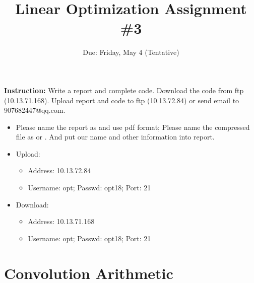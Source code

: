 \documentclass[12pt]{article}
\title{\textbf{Linear Optimization Assignment \#3}}
\author{Due: Friday, May 4 (Tentative)}
\date{}
\newcommand{\red}[1]{{\color{red}{#1}}}
\providecommand{\tightlist}{%
	\setlength{\itemsep}{0pt}\setlength{\parskip}{0pt}}
\begin{document}
\maketitle

\textbf{\color{NavyBlue}Instruction:} Write a report and complete code.
Download the code from ftp (10.13.71.168). Upload report and code to ftp (10.13.72.84) or send email to 907682447@qq.com.
\begin{itemize}
	\tightlist
	\item {Please} name the report as \red{hw3\_31xxxxxxxx.pdf} and use pdf format; {Please} name the compressed file as \red{hw3\_31xxxxxxxx.zip} or \red{hw3\_31xxxxxxxx.rar}. And put our name and other information into report.
	\item Upload:
	      \begin{itemize}
		      \tightlist
		      \item    Address: 10.13.72.84
		      \item Username: opt; Passwd:  opt18; Port: 21
	      \end{itemize}
	\item Download:
	      \begin{itemize}
		      \tightlist
		      \item Address: 10.13.71.168
		      \item  Username: opt; Passwd:  opt18; Port: 21
	      \end{itemize}
\end{itemize}

\section{Convolution Arithmetic}
\end{document}
